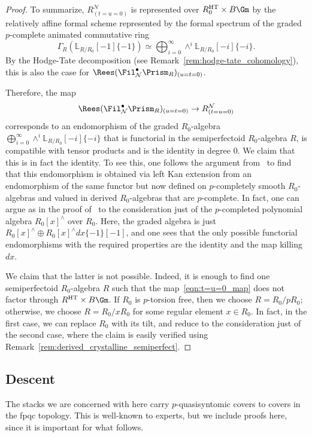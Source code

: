 \documentclass[10pt]{amsart}
\begin{document}
\begin{proof}
To summarize, $R^{\mathcal{N}}_{(t=u=0)}$ is represented over $R_0^{\mathrm{HT}}\times B\Gm$ by the relatively affine formal scheme represented by the formal spectrum of the graded $p$-complete animated commutative ring
\[
\Gamma_R(\mathbb{L}_{R/R_0}[-1]\{-1\}) \simeq \bigoplus_{i=0}^\infty \wedge^i\mathbb{L}_{R/R_0}[-i]\{-i\}.
\]
By the Hodge-Tate decomposition (see Remark~\ref{rem:hodge-tate_cohomology}), this is also the case for $\Rees(\Fil^\bullet_{\mathcal{N}}\Prism_R)_{(u=t=0)}$. 

Therefore, the map
\begin{align}\label{eqn:t=u=0_map}
\Rees(\Fil^\bullet_{\mathcal{N}}\Prism_R)_{(u=t=0)}\to R^{\mathcal{N}}_{(t=u=0)}
\end{align}
corresponds to an endomorphism of the graded $R_0$-algebra $\bigoplus_{i=0}^\infty \wedge^i\mathbb{L}_{R/R_0}[-i]\{-i\}$ that is functorial in the semiperfectoid $R_0$-algebra $R$, is compatible with tensor products and is the identity in degree $0$. We claim that this is in fact the identity. To see this, one follows the argument from~\cite[Theorem 5.5.10]{bhatt_lectures} to find that this endomorphism is obtained via left Kan extension from an endomorphism of the same functor but now defined on $p$-completely smooth $R_0$-algebras and valued in derived $R_0$-algebras that are $p$-complete. In fact, one can argue as in the proof of~\cite[Theorem 7.17]{bhatt2022prismatization} to the consideration just of the $p$-completed polynomial algebra $R_0[x]^{\wedge}$ over $R_0$. Here, the graded algebra is just $R_0[x]^{\wedge}\oplus R_0[x]^{\wedge}dx\{-1\}[-1]$, and one sees that the only possible functorial endomorphisms with the required properties are the identity and the map killing $dx$. 

We claim that the latter is not possible. Indeed, it is enough to find one semiperfectoid $R_0$-algebra $R$ such that the map~\eqref{eqn:t=u=0_map} does not factor through $R^{\mathrm{HT}}\times B\Gm$. If $R_0$ is $p$-torsion free, then we choose $R = R_0/pR_0$; otherwise, we choose $R = R_0/xR_0$ for some regular element $x\in R_0$. In fact, in the first case, we can replace $R_0$ with its tilt, and reduce to the consideration just of the second case, where the claim is easily verified using Remark~\ref{rem:derived_crystalline_semiperfect}.
\end{proof}




\subsection{Descent}
\label{subsec:descent_stacks}
The stacks we are concerned with here carry $p$-quasisyntomic covers to covers in the fpqc topology. This is well-known to experts, but we include proofs here, since it is important for what follows.
\end{document}
